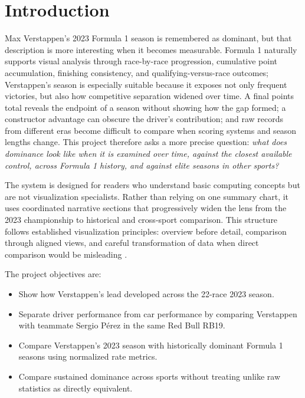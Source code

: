 \documentclass[conference]{IEEEtran}
\begin{document}
\section{Introduction}
Max Verstappen's 2023 Formula 1 season is remembered as dominant, but that description is more interesting when it becomes measurable. Formula 1 naturally supports visual analysis through race-by-race progression, cumulative point accumulation, finishing consistency, and qualifying-versus-race outcomes; Verstappen's season is especially suitable because it exposes not only frequent victories, but also how competitive separation widened over time. A final points total reveals the endpoint of a season without showing how the gap formed; a constructor advantage can obscure the driver's contribution; and raw records from different eras become difficult to compare when scoring systems and season lengths change. This project therefore asks a more precise question: \emph{what does dominance look like when it is examined over time, against the closest available control, across Formula 1 history, and against elite seasons in other sports?}

The system is designed for readers who understand basic computing concepts but are not visualization specialists. Rather than relying on one summary chart, it uses coordinated narrative sections that progressively widen the lens from the 2023 championship to historical and cross-sport comparison. This structure follows established visualization principles: overview before detail, comparison through aligned views, and careful transformation of data when direct comparison would be misleading \cite{munzner2014visualization,wilke2019fundamentals,segel2010narrative}.

The project objectives are:
\begin{itemize}
    \item Show how Verstappen's lead developed across the 22-race 2023 season.
    \item Separate driver performance from car performance by comparing Verstappen with teammate Sergio P\'erez in the same Red Bull RB19.
    \item Compare Verstappen's 2023 season with historically dominant Formula 1 seasons using normalized rate metrics.
    \item Compare sustained dominance across sports without treating unlike raw statistics as directly equivalent.
\end{itemize}
\end{document}
